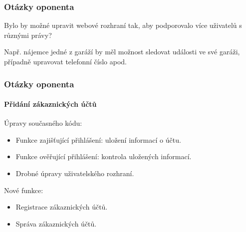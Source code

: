 \documentclass{beamer}
\begin{document}
  \begin{frame}[noframenumbering]
    \frametitle{Otázky oponenta}

    Bylo by možné upravit webové rozhraní tak, aby podporovalo více uživatelů s různými právy? 

    Např. nájemce jedné z garáží by měl možnost sledovat události ve své garáži, případně upravovat telefonní číslo apod.

  \end{frame}

  \begin{frame}[noframenumbering]
    \frametitle{Otázky oponenta}
    \framesubtitle{Přidání zákaznických účtů}

    Úpravy současného kódu:

    \begin{itemize}
      \item Funkce zajišťující přihlášení: uložení informací o účtu. %
      \item Funkce ověřující přihlášení: kontrola uložených informací.
      \item Drobné úpravy uživatelského rozhraní. %
    \end{itemize}

    Nové funkce:

    \begin{itemize}
      \item Registrace zákaznických účtů. %
      \item Správa zákaznických účtů. %
    \end{itemize}

  \end{frame}
\end{document}
